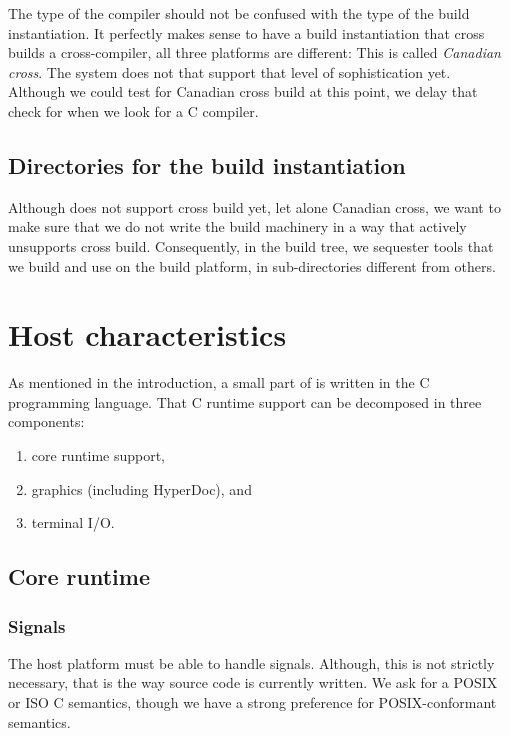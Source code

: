 \documentclass[12pt]{article}
\begin{document}
The type of the compiler should not be confused with the type of the
build instantiation.  It perfectly makes sense to have a build
instantiation that cross builds a cross-compiler, \ie{} all three
platforms are different: This is called \emph{Canadian cross}.
The  system does not that support that level of
sophistication yet.  Although we could test for Canadian cross build
at this point, we delay that check for when we look for a C compiler.

\subsection{Directories for the build instantiation}

Although  does not support cross build yet, let
alone Canadian cross, we want to make sure that we do not write
the build machinery in a way that actively unsupports
cross build.  Consequently, in the build tree, we sequester
tools that we build and use on the build platform,
in  sub-directories different from others.

\section{Host characteristics}

As mentioned in the introduction, a small part of  is
written in the C programming language.  That C runtime support
can be decomposed in three components:
\begin{enumerate}
\item core runtime support,
\item graphics (including HyperDoc), and
\item terminal I/O.
\end{enumerate}

\subsection{Core runtime}

\subsubsection{Signals}

The host platform must be able to handle signals.  Although, this is
not strictly necessary, that is the way  source code
is currently written.  We ask for a POSIX or ISO C semantics, though
we have a strong preference for POSIX-conformant semantics.
\end{document}
